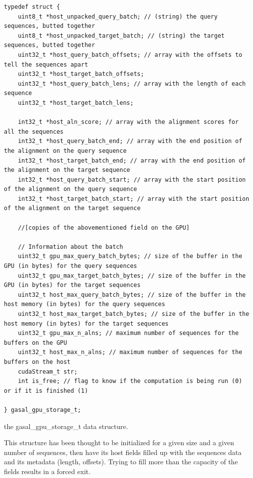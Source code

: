 \begin{listing}
	\begin{verbatim}
typedef struct {	
	uint8_t *host_unpacked_query_batch; // (string) the query sequences, butted together
	uint8_t *host_unpacked_target_batch; // (string) the target sequences, butted together
	uint32_t *host_query_batch_offsets; // array with the offsets to tell the sequences apart
	uint32_t *host_target_batch_offsets;
	uint32_t *host_query_batch_lens; // array with the length of each sequence
	uint32_t *host_target_batch_lens;
	
	int32_t *host_aln_score; // array with the alignment scores for all the sequences
	int32_t *host_query_batch_end; // array with the end position of the alignment on the query sequence
	int32_t *host_target_batch_end; // array with the end position of the alignment on the target sequence
	int32_t *host_query_batch_start; // array with the start position of the alignment on the query sequence
	int32_t *host_target_batch_start; // array with the start position of the alignment on the target sequence
	
	//[copies of the abovementioned field on the GPU]
	
	// Information about the batch
	uint32_t gpu_max_query_batch_bytes; // size of the buffer in the GPU (in bytes) for the query sequences
	uint32_t gpu_max_target_batch_bytes; // size of the buffer in the GPU (in bytes) for the target sequences
	uint32_t host_max_query_batch_bytes; // size of the buffer in the host memory (in bytes) for the query sequences
	uint32_t host_max_target_batch_bytes; // size of the buffer in the host memory (in bytes) for the target sequences
	uint32_t gpu_max_n_alns; // maximum number of sequences for the buffers on the GPU
	uint32_t host_max_n_alns; // maximum number of sequences for the buffers on the host
	cudaStream_t str; 
	int is_free; // flag to know if the computation is being run (0) or if it is finished (1)

} gasal_gpu_storage_t;
	\end{verbatim}
	\caption{the gasal\_gpu\_storage\_t data structure.}
	\label{lst:gpu_storage}
\end{listing}


This structure has been thought to be initialized for a given size and a given number of sequences, then have its host fields filled up with the sequences data and its metadata (length, offsets). Trying to fill more than the capacity of the fields results in a forced exit.

